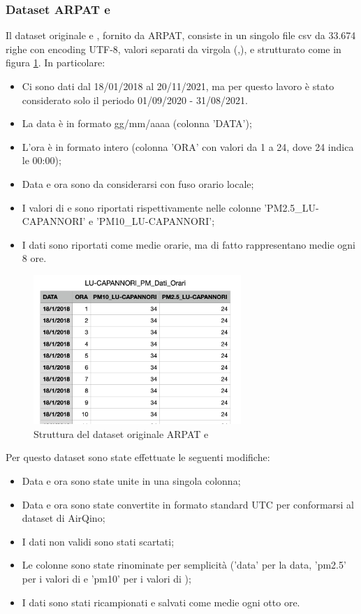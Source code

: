 \subsubsection{Dataset ARPAT  e }
Il dataset originale  e , fornito da ARPAT, consiste in un singolo file csv da 33.674 righe con encoding UTF-8, valori separati da virgola (,), e strutturato come in figura \ref{fig:pm-arpat}. In particolare:
\begin{itemize}
  \item Ci sono dati dal 18/01/2018 al 20/11/2021, ma per questo lavoro è stato considerato solo il periodo 01/09/2020 - 31/08/2021.
  \item La data è in formato gg/mm/aaaa (colonna 'DATA');
  \item L'ora è in formato intero (colonna 'ORA' con valori da 1 a 24, dove 24 indica le 00:00);
  \item Data e ora sono da considerarsi con fuso orario locale;
  \item I valori di  e  sono riportati rispettivamente nelle colonne 'PM2.5\_LU-CAPANNORI' e 'PM10\_LU-CAPANNORI';
  \item I dati sono riportati come medie orarie, ma di fatto rappresentano medie ogni 8 ore.
\end{itemize}

\begin{figure}[H]
\centering
\captionsetup{justification=centering}
\includegraphics[width=0.7\textwidth,height=\textheight,keepaspectratio]{img/dataset_arpat_pm_prima.png}
\caption{Struttura del dataset originale ARPAT  e }
\label{fig:pm-arpat}
\end{figure}

Per questo dataset sono state effettuate le seguenti modifiche:
\begin{itemize}
  \item Data e ora sono state unite in una singola colonna;
  \item Data e ora sono state convertite in formato standard UTC per conformarsi al dataset di AirQino;
  \item I dati non validi sono stati scartati;
  \item Le colonne sono state rinominate per semplicità ('data' per la data, 'pm2.5' per i valori di  e 'pm10' per i valori di );
  \item I dati sono stati ricampionati e salvati come medie ogni otto ore.\\
\end{itemize}

